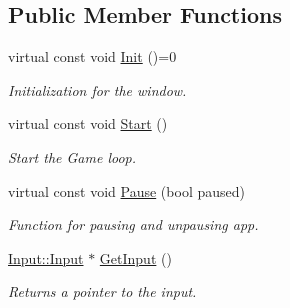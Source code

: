 \subsection*{Public Member Functions}
\begin{DoxyCompactItemize}
\item 
virtual const void \hyperlink{class_ensum_1_1_core_1_1_window_a43f467e7e5ea83f3a9b990b6edc2ec46}{Init} ()=0\hypertarget{class_ensum_1_1_core_1_1_window_a43f467e7e5ea83f3a9b990b6edc2ec46}{}\label{class_ensum_1_1_core_1_1_window_a43f467e7e5ea83f3a9b990b6edc2ec46}

\begin{DoxyCompactList}\small\item\em Initialization for the window. \end{DoxyCompactList}\item 
virtual const void \hyperlink{class_ensum_1_1_core_1_1_window_a2be80d0faaa9082f32df2416c8a0f42b}{Start} ()\hypertarget{class_ensum_1_1_core_1_1_window_a2be80d0faaa9082f32df2416c8a0f42b}{}\label{class_ensum_1_1_core_1_1_window_a2be80d0faaa9082f32df2416c8a0f42b}

\begin{DoxyCompactList}\small\item\em Start the Game loop. \end{DoxyCompactList}\item 
virtual const void \hyperlink{class_ensum_1_1_core_1_1_window_a2b417072a3e324cf5101f1b90a82f317}{Pause} (bool paused)\hypertarget{class_ensum_1_1_core_1_1_window_a2b417072a3e324cf5101f1b90a82f317}{}\label{class_ensum_1_1_core_1_1_window_a2b417072a3e324cf5101f1b90a82f317}

\begin{DoxyCompactList}\small\item\em Function for pausing and unpausing app. \end{DoxyCompactList}\item 
\hyperlink{class_ensum_1_1_input_1_1_input}{Input\+::\+Input} $\ast$ \hyperlink{class_ensum_1_1_core_1_1_window_af746ffdd0281b2722d162fbf96c3542b}{Get\+Input} ()\hypertarget{class_ensum_1_1_core_1_1_window_af746ffdd0281b2722d162fbf96c3542b}{}\label{class_ensum_1_1_core_1_1_window_af746ffdd0281b2722d162fbf96c3542b}

\begin{DoxyCompactList}\small\item\em Returns a pointer to the input. \end{DoxyCompactList}\end{DoxyCompactItemize}
